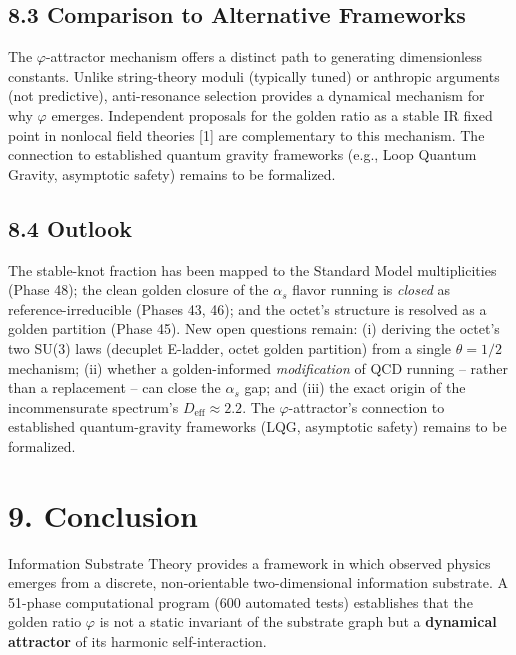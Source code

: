 \documentclass[
  11pt,
]{article}
\begin{document}
\subsection{8.3 Comparison to Alternative
Frameworks}\label{comparison-to-alternative-frameworks}

The \(\varphi\)-attractor mechanism offers a distinct path to generating
dimensionless constants. Unlike string-theory moduli (typically tuned)
or anthropic arguments (not predictive), anti-resonance selection
provides a dynamical mechanism for why \(\varphi\) emerges. Independent
proposals for the golden ratio as a stable IR fixed point in nonlocal
field theories {[}1{]} are complementary to this mechanism. The
connection to established quantum gravity frameworks (e.g., Loop Quantum
Gravity, asymptotic safety) remains to be formalized.

\subsection{8.4 Outlook}\label{outlook}

The stable-knot fraction has been mapped to the Standard Model
multiplicities (Phase 48); the clean golden closure of the \(\alpha_s\)
flavor running is \emph{closed} as reference-irreducible (Phases 43,
46); and the octet's structure is resolved as a golden partition (Phase
45). New open questions remain: (i) deriving the octet's two SU(3) laws
(decuplet E-ladder, octet golden partition) from a single
\(\theta = 1/2\) mechanism; (ii) whether a golden-informed
\emph{modification} of QCD running -- rather than a replacement -- can
close the \(\alpha_s\) gap; and (iii) the exact origin of the
incommensurate spectrum's \(D_{\text{eff}} \approx 2.2\). The
\(\varphi\)-attractor's connection to established quantum-gravity
frameworks (LQG, asymptotic safety) remains to be formalized.

\section{9. Conclusion}\label{conclusion}

Information Substrate Theory provides a framework in which observed
physics emerges from a discrete, non-orientable two-dimensional
information substrate. A 51-phase computational program (600 automated
tests) establishes that the golden ratio \(\varphi\) is not a static
invariant of the substrate graph but a \textbf{dynamical attractor} of
its harmonic self-interaction.
\end{document}
